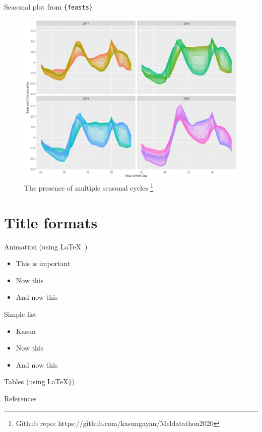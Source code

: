 \documentclass[12pt,ignorenonframetext,]{beamer}
\newif\ifbibliography
\begin{document}
\begin{frame}{Seasonal plot from \texttt{\{feasts\}}}
\protect\hypertarget{seasonal-plot-from}{}

\begin{figure}
  \includegraphics[width=.55\textwidth,height=.55\textheight,keepaspectratio]{images/daily_seasonal.png}
  \caption{The presence of multiple seasonal cycles%
    \footnote{%
     \tiny{Github repo: https://github.com/kasungayan/Meldatathon2020} 
    }%
  }
\end{figure}

\end{frame}

\hypertarget{title-formats}{%
\section{Title formats}\label{title-formats}}

\begin{frame}{Animation (using \LaTeX~)}
\protect\hypertarget{animation-using}{}

\begin{itemize}[<+- | alert@+>]
  \item \alert<4>{This is important}
  \item Now this
  \item And now this
\end{itemize}

\end{frame}

\begin{frame}{Simple list}
\protect\hypertarget{simple-list}{}

\begin{itemize}
  \item Kasun
  \item Now this
  \item And now this
\end{itemize}

\end{frame}

\begin{frame}{Tables (using \LaTeX\})}
\protect\hypertarget{tables-using}{}

\end{frame}

                    \renewcommand\refname{References}
              \begin{frame}[allowframebreaks]{References}
    \bibliographytrue
    
    \end{frame}
  
\end{document}
